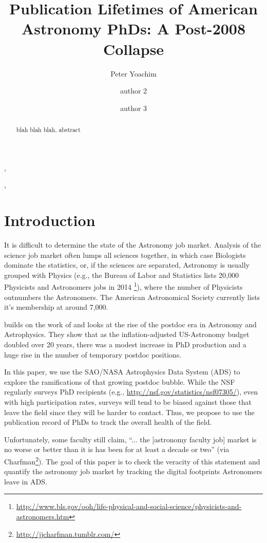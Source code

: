 \documentclass[preprint2]{aastex}
\begin{document}
\title{Publication Lifetimes of American Astronomy PhDs: A Post-2008 Collapse}

\author{Peter Yoachim}, \author{author 2}, \author{author 3} 
  


\begin{abstract}
blah blah blah, abstract

\end{abstract}



\section{Introduction}

It is difficult to determine the state of the Astronomy job market.  Analysis of the science job market often lumps all sciences together, in which case Biologists dominate the statistics, or, if the sciences are separated, Astronomy is usually grouped with Physics (e.g., the Bureau of Labor and Statistics lists 20,000 Physicists and Astronomers jobs in 2014 \footnote{\url{http://www.bls.gov/ooh/life-physical-and-social-science/physicists-and-astronomers.htm}}), where the number of Physicists outnumbers the Astronomers.  The American Astronomical Society currently lists it's membership at around 7,000.

\citet{Seth09} builds on the work of \citet{Metcalfe08} and looks at the rise of the postdoc era in Astronomy and Astrophysics.  They show that as the inflation-adjusted US-Astronomy budget doubled over 20 years, there was a modest increase in PhD production and a huge rise in the number of temporary postdoc positions.

In this paper, we use the SAO/NASA Astrophysics Data System (ADS) to explore the ramifications of that growing postdoc bubble.  While the NSF regularly surveys PhD recipients (e.g., \url{http://nsf.gov/statistics/nsf07305/}), even with high participation rates, surveys will tend to be biased against those that leave the field since they will be harder to contact.  Thus, we propose to use the publication record of PhDs to track the overall health of the field.  

Unfortunately, some faculty still claim, ``... the [astronomy faculty job] market is no worse or better than it is has been for at least a decade or two'' (via Charfman\footnote{\url{http://jjcharfman.tumblr.com/}}).  The goal of this paper is to check the veracity of this statement and quantify the astronomy job market by tracking the digital footprints Astronomers leave in ADS. 
\end{document}
